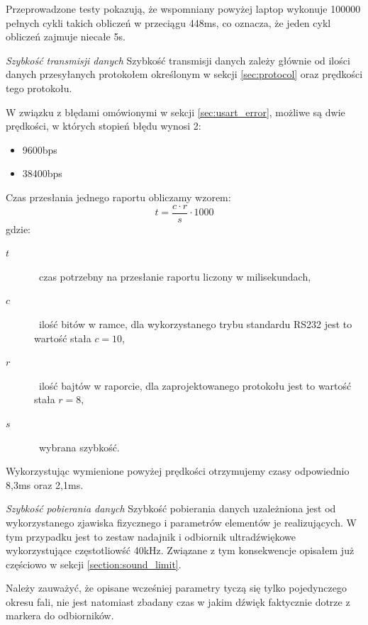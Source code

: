 Przeprowadzone testy pokazują, że wspomniany powyżej laptop wykonuje 100000 pełnych cykli takich obliczeń w przeciągu 448ms, co oznacza, że jeden cykl obliczeń zajmuje niecałe 5\textmu s.


\textsl{Szybkość transmisji danych}
Szybkość transmisji danych zależy głównie od ilości danych przesyłanych protokołem określonym w sekcji \ref{sec:protocol} oraz prędkości tego protokołu.

W związku z błędami omówionymi w sekcji \ref{sec:usart_error}, możliwe są dwie prędkości, w których stopień błędu wynosi 2\textperthousand:
\begin{itemize}
 \item 9600bps
 \item 38400bps
\end{itemize}

Czas przesłania jednego raportu obliczamy wzorem:
\begin{equation}
 t = \frac{c \cdot r}{s} \cdot 1000
\end{equation}
gdzie:
\begin{description}
 \item[$t$] \ppauza~czas potrzebny na przesłanie raportu liczony w milisekundach,
 \item[$c$] \ppauza~ilość bitów w ramce, dla wykorzystanego trybu standardu RS232 jest to wartość stała $c = 10$,
 \item[$r$] \ppauza~ilość bajtów w raporcie, dla zaprojektowanego protokołu jest to wartość stała $r = 8$,
 \item[$s$] \ppauza~wybrana szybkość.
\end{description}

Wykorzystując wymienione powyżej prędkości otrzymujemy czasy odpowiednio 8,3ms oraz 2,1ms.

\textsl{Szybkość pobierania danych}
Szybkość pobierania danych uzależniona jest od wykorzystanego zjawiska fizycznego i parametrów elementów je realizujących. W tym przypadku jest to zestaw nadajnik i odbiornik ultradźwiękowe wykorzystujące częstotliowść 40kHz. Związane z tym konsekwencje opisałem już częściowo w sekcji \ref{section:sound_limit}.

Należy zauważyć, że opisane wcześniej parametry tyczą się tylko pojedynczego okresu fali, nie jest natomiast zbadany czas w jakim dźwięk faktycznie dotrze z markera do odbiorników.

